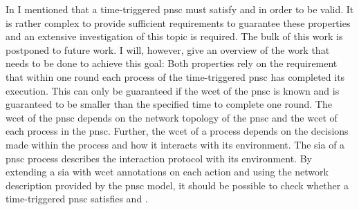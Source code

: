 In \Sect{\ref{sect_tcm_time_tt}} I mentioned that a time-triggered \gls{pnsc} must satisfy \Propty{\ref{propty_tt_in}} and \Propty{\ref{propty_tt_out}} in order to be valid.
It is rather complex to provide sufficient requirements to guarantee these properties and an extensive investigation of this topic is required.
The bulk of this work is postponed to future work.
I will, however, give an overview of the work that needs to be done to achieve this goal:
Both properties rely on the requirement that within one round each process of the time-triggered \gls{pnsc} has completed its execution.
This can only be guaranteed if the \gls{wcet} of the \gls{pnsc} is known and is guaranteed to be smaller than the specified time to complete one round.
The \gls{wcet} of the \gls{pnsc} depends on the network topology of the \gls{pnsc} and the \gls{wcet} of each process in the \gls{pnsc}.
Further, the \gls{wcet} of a process depends on the decisions made within the process and how it interacts with its environment.
The \gls{sia} of a \gls{pnsc} process describes the interaction protocol with its environment.
By extending a \gls{sia} with \gls{wcet} annotations on each action and using the network description provided by the \gls{pnsc} model, it should be possible to check whether a time-triggered \gls{pnsc} satisfies \Propty{\ref{propty_tt_in}} and \Propty{\ref{propty_tt_out}}.




